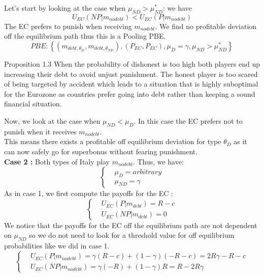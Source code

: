 \documentclass{article}
\begin{document}
Let's start by looking at the case when $\mu_{ND}>\mu_{ND}^*$: we have
\begin{equation}
    U_{EC}(NP|m_{nodebt})<U_{EC}(P|m_{nodebt})
\end{equation}
The EC prefers to punish when receiving $m_{nodebt}$. We find no profitable deviation off the equilibrium path thus this is a Pooling PBE.
$$PBE : \left\{ (m_{debt,\theta_D},m_{debt,\theta_{ND}}),(P_{EC},P_{EC}),\mu_D=\gamma,\mu_{ND}>\mu_{ND}^*\right\}$$
\begin{simplebox}{Proposition 1.3}
    When the probability of dishonest is too high both players end up increasing their debt to avoid unjust punishment. The honest player is too scared of being targeted by accident which leads to a situation that is highly suboptimal for the Eurozone as countries prefer going into debt rather than keeping a sound financial situation. 
\end{simplebox}
Now, we look at the case when $\mu_{ND}<\mu_D$. In this case the EC prefers not to punish when it receives $m_{nodebt}$. \\
This means there exists a profitable off equilibrium deviation for type $\theta_D$ as it can now safely go for superbonus without fearing punishment.\\ 
\indent\textbf{Case 2 : }
Both types of Italy play $m_{nodebt}$. Thus, we have: 
\begin{equation}
\left\{
\begin{aligned}
    &\mu_D = arbitrary\\
    &\mu_{ND}= \gamma
\end{aligned}
\right.
\end{equation}
As in case 1, we first compute the payoffs for the EC :
\begin{equation}
\left\{
\begin{aligned}
    &U_{EC}(P|m_{debt})=R-c\\
    &U_{EC}(NP|m_{debt})=0
\end{aligned}
\right.
\end{equation}
We notice that the payoffs for the EC off the equilibrium path are not dependent on $\mu_{ND}$ so we do not need to look for a threshold value for off equilibrium probabilities like we did in case 1. 
\begin{equation}
\left\{
\begin{aligned}
    &U_{EC}(P|m_{nodebt})=\gamma(R-c)+(1-\gamma)(-R-c)=2R\gamma-R-c\\
    &U_{EC}(NP|m_{nodebt})=\gamma(-R)+(1-\gamma)R = R-2R\gamma
\end{aligned}
\right.
\end{equation}
\end{document}
